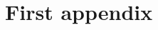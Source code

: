 \documentclass[bsc,frontabs,parskip,deptreport]{infthesis}
\begin{document}








\appendix
\chapter{First appendix}
\end{document}
